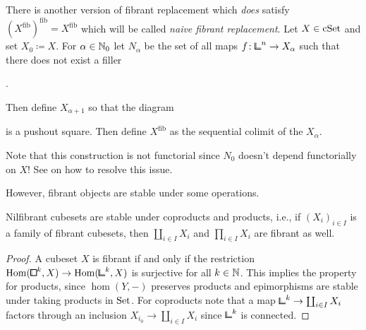 \begin{construction}
There is another version of fibrant replacement which \emph{does} satisfy $(X^\mathrm{fib})^\mathrm{fib} = X^\mathrm{fib}$
which will be called \emph{naive fibrant replacement}.
Let $X\in\mathrm{cSet}$ and set $X_0\coloneqq X$.
For $\alpha\in{\mathbb{N}}_0$ let $N_\alpha$ be the set of all maps $f\colon{\bbcor}^n\to X_\alpha$
such that there does not exist a filler
\begin{center}
.
\end{center}
Then define $X_{\alpha+1}$ so that the diagram
\begin{center}
\end{center}
is a pushout square.
Then define $X^\mathrm{fib}$ as the sequential colimit of the $X_\alpha$.

Note that this construction is not functorial since $N_0$ doesn't depend functorially on $X$!
See \cite{Nikolaus2011} on how to resolve this issue.
\end{construction}

However, fibrant objects are stable under some operations.

\begin{lemma}
Nilfibrant cubesets are stable under coproducts and products, i.e.,
if $(X_i)_{i\in I}$ is a family of fibrant cubesets, then $\coprod_{i\in I} X_i$ and $\prod_{i\in I} X_i$ are fibrant as well.
\end{lemma}

\begin{proof}
A cubeset $X$ is fibrant if and only if the restriction $\hom({\bbox}^k,X)\to\hom({\bbcor}^k,X)$ is surjective for all $k\in{\mathbb{N}}$.
This implies the property for products, since $\hom(Y,-)$ preserves products and epimorphisms are stable under taking products in $\mathrm{Set}$.
For coproducts note that a map ${\bbcor}^k\to\coprod_{i\in I} X_i$ factors through an inclusion $X_{i_0}\to\coprod_{i\in I} X_i$
since ${\bbcor}^k$ is connected.
\end{proof}


